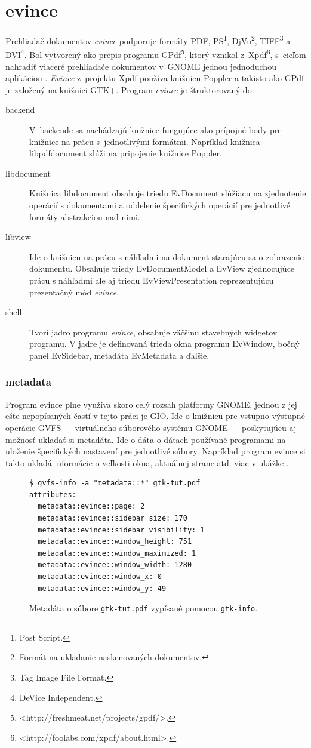 \documentclass[12pt,oneside,final]{fithesis2}
\begin{document}
\chapter{evince}
Prehliadač dokumentov \emph{evince} podporuje formáty PDF, PS\footnote{Post Script.}, DjVu\footnote{Formát na ukladanie naskenovaných dokumentov.}, TIFF\footnote{Tag Image File Format.} a DVI\footnote{DeVice Independent.}. Bol vytvorený ako prepis programu GPdf\footnote{<http://freshmeat.net/projects/gpdf/>.}, ktorý vznikol z~Xpdf\footnote{<http://foolabs.com/xpdf/about.html>.}, s~cieľom nahradiť viaceré prehliadače dokumentov v~GNOME jednou jednoduchou aplikáciou \cite{evince}. \emph{Evince} z~projektu Xpdf používa knižnicu Poppler a takisto ako GPdf je založený na knižnici GTK+. Program \emph{evince} je štruktorovaný do:
\begin{description}
\item[backend] V~backende sa nachádzajú knižnice fungujúce ako prípojné body pre knižnice na prácu s~jednotlivými formátmi. Napríklad knižnica libpdfdocument slúži na pripojenie knižnice Poppler.
\item[libdocument] Knižnica libdocument obsahuje triedu EvDocument slúžiacu na zjednotenie operácií s dokumentami a oddelenie špecifických operácií pre jednotlivé formáty abstrakciou nad nimi.
\item[libview] Ide o knižnicu na prácu s náhľadmi na dokument starajúcu sa o zobrazenie dokumentu. Obsahuje triedy EvDocumentModel a EvView zjednocujúce prácu s náhľadmi ale aj triedu EvViewPresentation reprezentujúcu prezentačný mód \emph{evince}.
\item[shell] Tvorí jadro programu \emph{evince}, obsahuje väčšinu stavebných widgetov programu. V jadre je definovaná trieda okna programu EvWindow, bočný panel EvSidebar, metadáta EvMetadata a ďalšie.
\end{description}
\subsection{metadata}
Program evince plne využíva skoro celý rozsah platformy GNOME, jednou z jej ešte nepopísaných častí v tejto práci je GIO. Ide o knižnicu pre vstupno-výstupné operácie GVFS --- virtuálneho súborového systému GNOME --- poskytujúcu aj možnosť ukladať si metadáta. Ide o dáta o dátach používané programami na uloženie špecifických nastavení pre jednotlivé súbory. Napríklad program evince si takto ukladá informácie o veľkosti okna, aktuálnej strane atď. viac v ukážke \cite{meta}.
\begin{figure}
\begin{tiny}
\begin{verbatim}
$ gvfs-info -a "metadata::*" gtk-tut.pdf 
attributes:
  metadata::evince::page: 2
  metadata::evince::sidebar_size: 170
  metadata::evince::sidebar_visibility: 1
  metadata::evince::window_height: 751
  metadata::evince::window_maximized: 1
  metadata::evince::window_width: 1280
  metadata::evince::window_x: 0
  metadata::evince::window_y: 49
\end{verbatim}
\end{tiny}
\caption{Metadáta o súbore \verb|gtk-tut.pdf| vypísané pomocou \verb|gtk-info|.}
\label{meta}
\end{figure}
\end{document}
